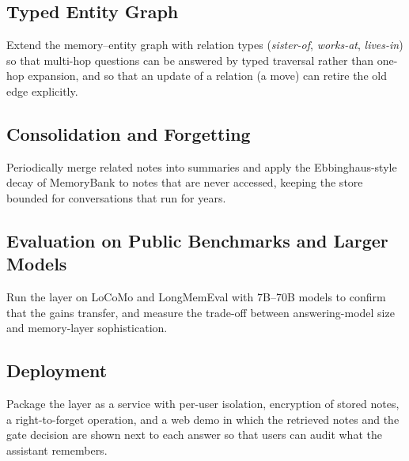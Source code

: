 \subsection{Typed Entity Graph}
Extend the memory--entity graph with relation types (\emph{sister-of}, \emph{works-at},
\emph{lives-in}) so that multi-hop questions can be answered by typed traversal rather than one-hop
expansion, and so that an update of a relation (a move) can retire the old edge explicitly.

\subsection{Consolidation and Forgetting}
Periodically merge related notes into summaries and apply the Ebbinghaus-style decay of MemoryBank to
notes that are never accessed, keeping the store bounded for conversations that run for years.

\subsection{Evaluation on Public Benchmarks and Larger Models}
Run the layer on LoCoMo and LongMemEval with 7B--70B models to confirm that the gains transfer, and
measure the trade-off between answering-model size and memory-layer sophistication.

\subsection{Deployment}
Package the layer as a service with per-user isolation, encryption of stored notes, a right-to-forget
operation, and a web demo in which the retrieved notes and the gate decision are shown next to each
answer so that users can audit what the assistant remembers.
